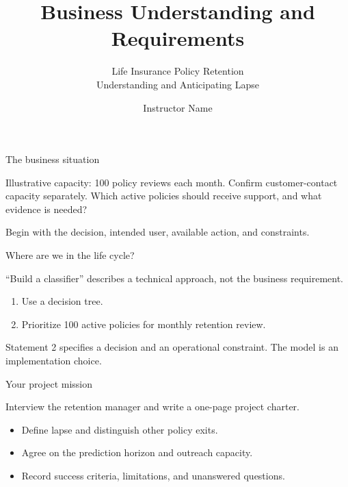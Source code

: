 \documentclass[aspectratio=169,12pt]{beamer}
\title{Business Understanding and Requirements}
\subtitle{Life Insurance Policy Retention\\Understanding and Anticipating Lapse}
\author{Instructor Name}
\institute{National University}
\date{}
\begin{document}
\begin{frame}[plain]\titlepage\end{frame}
\begin{frame}{The business situation}
\begin{insuranceexample}
Illustrative capacity: 100 policy reviews each month. Confirm customer-contact capacity separately.
Which active policies should receive support, and what evidence is needed?
\end{insuranceexample}
\begin{conceptblock}
Begin with the decision, intended user, available action, and constraints.
\end{conceptblock}
\end{frame}
\begin{frame}{Where are we in the life cycle?}
\begin{commonmistake}
``Build a classifier'' describes a technical approach, not the business requirement.
\end{commonmistake}
\end{frame}
{\begin{enumerate}
\item Use a decision tree.
\item Prioritize 100 active policies for monthly retention review.
\end{enumerate}}
{Statement 2 specifies a decision and an operational constraint.
The model is an implementation choice.}
\begin{frame}{Your project mission}
\begin{projecttask}
Interview the retention manager and write a one-page project charter.
\end{projecttask}
\begin{itemize}
\item Define lapse and distinguish other policy exits.
\item Agree on the prediction horizon and outreach capacity.
\item Record success criteria, limitations, and unanswered questions.
\end{itemize}
\end{frame}
\end{document}
